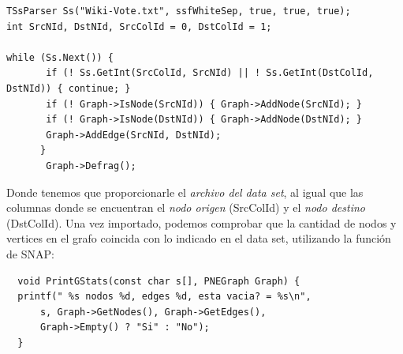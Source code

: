 \documentclass[acmlarge,screen]{acmart}
\begin{document}
\begin{verbatim}
TSsParser Ss("Wiki-Vote.txt", ssfWhiteSep, true, true, true); 
int SrcNId, DstNId, SrcColId = 0, DstColId = 1;

while (Ss.Next()) {
       if (! Ss.GetInt(SrcColId, SrcNId) || ! Ss.GetInt(DstColId, DstNId)) { continue; }
       if (! Graph->IsNode(SrcNId)) { Graph->AddNode(SrcNId); }
       if (! Graph->IsNode(DstNId)) { Graph->AddNode(DstNId); }
       Graph->AddEdge(SrcNId, DstNId);
      }
       Graph->Defrag();

\end{verbatim}
Donde tenemos que proporcionarle el {\it archivo del data set}, al igual que las columnas donde se encuentran el {\it nodo origen} (SrcColId) y el {\it nodo destino} (DstColId). Una vez importado, podemos comprobar que la cantidad de nodos y vertices en el grafo coincida con lo indicado en el data set, utilizando la función de SNAP:
\\

\begin{verbatim}
  void PrintGStats(const char s[], PNEGraph Graph) {
  printf(" %s nodos %d, edges %d, esta vacia? = %s\n",
      s, Graph->GetNodes(), Graph->GetEdges(),
      Graph->Empty() ? "Si" : "No");
  }
\end{verbatim}
\end{document}
